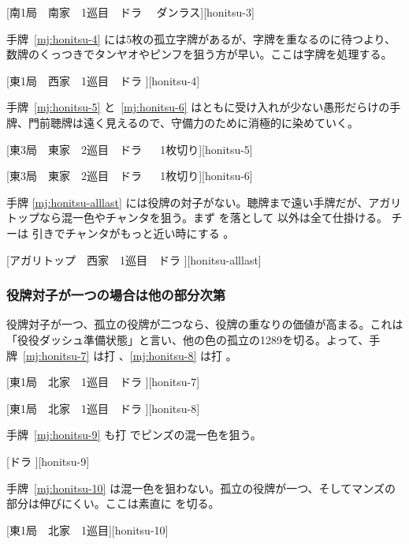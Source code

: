 \documentclass[../nankiru_main.tex]{subfiles}
\begin{document}
[南1局　南家　1巡目　ドラ 　ダンラス][honitsu-3]

手牌~\ref{mj:honitsu-4} には5枚の孤立字牌があるが、字牌を重なるのに待つより、数牌のくっつきでタンヤオやピンフを狙う方が早い。ここは字牌を処理する\citep{yuusee-honitsu}。

[東1局　西家　1巡目　ドラ ][honitsu-4]

手牌~\ref{mj:honitsu-5} と~\ref{mj:honitsu-6} はともに受け入れが少ない愚形だらけの手牌、門前聴牌は遠く見えるので、守備力のために消極的に染めていく\citep{shibukawa-honitsu}。

[東3局　東家　2巡目　ドラ 　 1枚切り][honitsu-5]

[東3局　東家　2巡目　ドラ 　 1枚切り][honitsu-6]

手牌 \ref{mj:honitsu-alllast} には役牌の対子がない。聴牌まで遠い手牌だが、アガリトップなら混一色やチャンタを狙う。まず  を落として  以外は全て仕掛ける。 チーは  引きでチャンタがもっと近い時にする \citep[][pp.~37--38]{kawamura-naki}。

[アガリトップ　西家　1巡目　ドラ ][honitsu-alllast]


\subsubsection*{役牌対子が一つの場合は他の部分次第}

役牌対子が一つ、孤立の役牌が二つなら、役牌の重なりの価値が高まる。これは「役役ダッシュ準備状態」と言い、他の色の孤立の1289を切る\citep[][p.~97]{zero-teyaku}。よって、手牌~\ref{mj:honitsu-7} は打 、\ref{mj:honitsu-8} は打 。

[東1局　北家　1巡目　ドラ ][honitsu-7]

[東1局　北家　1巡目　ドラ ][honitsu-8]

手牌~\ref{mj:honitsu-9} も打  でピンズの混一色を狙う\citep{hirasawa-honitsu}。

[ドラ ][honitsu-9]

手牌~\ref{mj:honitsu-10} は混一色を狙わない。孤立の役牌が一つ、そしてマンズの部分は伸びにくい。ここは素直に  を切る\citep[][p.~98]{zero-teyaku}。

[東1局　北家　1巡目][honitsu-10]
\end{document}
